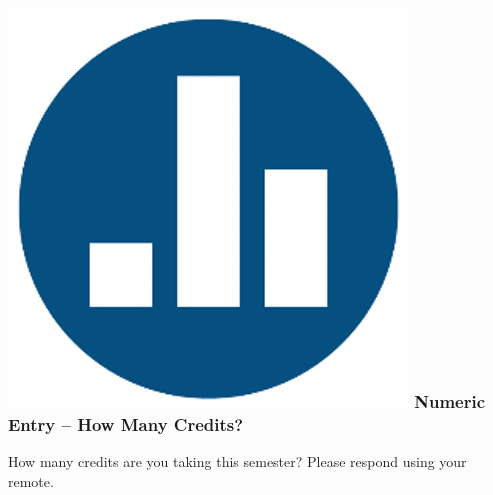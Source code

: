 \begin{frame}

\frametitle{\includegraphics[scale = 0.05]{./images/clicker} \hfill  Numeric Entry -- How Many Credits?}

How many credits are you taking this semester? Please respond using your remote.

\end{frame}

